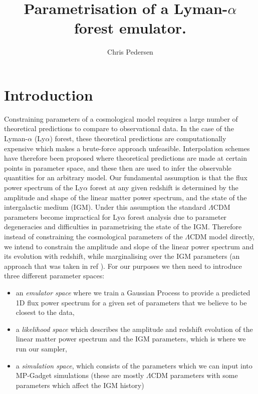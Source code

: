 \documentclass[]{article}
\title{Parametrisation of a Lyman-$\alpha$ forest emulator.}
\author[a]{Chris Pedersen}
\affiliation[a]{Department of Physics and Astronomy, University College London, Gower Street, London, United Kingdom}
\newcommand{\lyaf}{Ly$\alpha$ forest }                     %
\newcommand{\lya}{Ly$\alpha$}
\begin{document}
\maketitle

\section{Introduction}
Constraining parameters of a cosmological model requires a large number of theoretical 
predictions to compare to observational data. In the case of the Lyman-$\alpha$ (\lya) 
forest, these theoretical predictions are computationally expensive which makes a 
brute-force approach unfeasible. Interpolation schemes have therefore been proposed where 
theoretical predictions are made at certain points in parameter space, and these then are 
used to infer the observable quantities for an arbitrary model.
Our fundamental assumption is that the flux power spectrum of the \lyaf at any given 
redshift is determined by the amplitude and shape of the linear matter power spectrum, 
and the state of the intergalactic medium (IGM). Under this assumption the standard 
$\Lambda$CDM parameters become impractical for \lyaf analysis due to parameter 
degeneracies and difficulties in parametrising the state of the IGM. Therefore instead of 
constraining the cosmological parameters of the $\Lambda$CDM model directly, we intend to 
constrain the amplitude and slope of the linear power spectrum and its evolution with 
redshift, while marginalising over the IGM parameters (an approach that was taken in ref 
\cite{McDonald2005}). For our purposes we then need to introduce three different 
parameter spaces:


\begin{itemize}
    \item an \textit{emulator space} where we train a Gaussian Process to provide a 
    predicted 1D flux power spectrum for a given set of parameters that we believe to be 
    closest to the data,
    \item a \textit{likelihood space} which describes the amplitude and redshift 
    evolution of the linear matter power spectrum and the IGM parameters, which is where 
    we run our sampler,
    \item a \textit{simulation space}, which consists of the parameters which we can 
    input into MP-Gadget simulations (these are mostly $\Lambda$CDM parameters with some 
    parameters which affect the IGM history)
\end{itemize}
\end{document}

